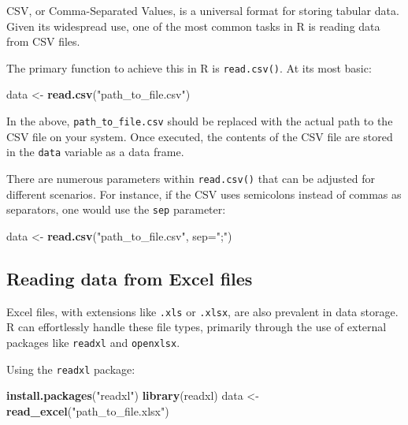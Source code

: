 \documentclass[
  b5paper]{book}
\newenvironment{Shaded}{\begin{snugshade}}{\end{snugshade}}
\newcommand{\AttributeTok}[1]{\textcolor[rgb]{0.13,0.29,0.53}{#1}}
\newcommand{\FunctionTok}[1]{\textcolor[rgb]{0.13,0.29,0.53}{\textbf{#1}}}
\newcommand{\NormalTok}[1]{#1}
\newcommand{\OtherTok}[1]{\textcolor[rgb]{0.56,0.35,0.01}{#1}}
\newcommand{\StringTok}[1]{\textcolor[rgb]{0.31,0.60,0.02}{#1}}
\begin{document}
CSV, or Comma-Separated Values, is a universal format for storing tabular data. Given its widespread use, one of the most common tasks in R is reading data from CSV files.

The primary function to achieve this in R is \texttt{read.csv()}. At its most basic:

\begin{Shaded}
\begin{Highlighting}[]
\NormalTok{data }\OtherTok{\textless{}{-}} \FunctionTok{read.csv}\NormalTok{(}\StringTok{"path\_to\_file.csv"}\NormalTok{)}
\end{Highlighting}
\end{Shaded}

In the above, \texttt{path\_to\_file.csv} should be replaced with the actual path to the CSV file on your system. Once executed, the contents of the CSV file are stored in the \texttt{data} variable as a data frame.

There are numerous parameters within \texttt{read.csv()} that can be adjusted for different scenarios. For instance, if the CSV uses semicolons instead of commas as separators, one would use the \texttt{sep} parameter:

\begin{Shaded}
\begin{Highlighting}[]
\NormalTok{data }\OtherTok{\textless{}{-}} \FunctionTok{read.csv}\NormalTok{(}\StringTok{"path\_to\_file.csv"}\NormalTok{, }\AttributeTok{sep=}\StringTok{";"}\NormalTok{)}
\end{Highlighting}
\end{Shaded}

\hypertarget{reading-data-from-excel-files}{%
\subsection*{Reading data from Excel files}\label{reading-data-from-excel-files}}

Excel files, with extensions like \texttt{.xls} or \texttt{.xlsx}, are also prevalent in data storage. R can effortlessly handle these file types, primarily through the use of external packages like \texttt{readxl} and \texttt{openxlsx}.

Using the \texttt{readxl} package:

\begin{Shaded}
\begin{Highlighting}[]
\FunctionTok{install.packages}\NormalTok{(}\StringTok{"readxl"}\NormalTok{)}
\FunctionTok{library}\NormalTok{(readxl)}
\NormalTok{data }\OtherTok{\textless{}{-}} \FunctionTok{read\_excel}\NormalTok{(}\StringTok{"path\_to\_file.xlsx"}\NormalTok{)}
\end{Highlighting}
\end{Shaded}
\end{document}
